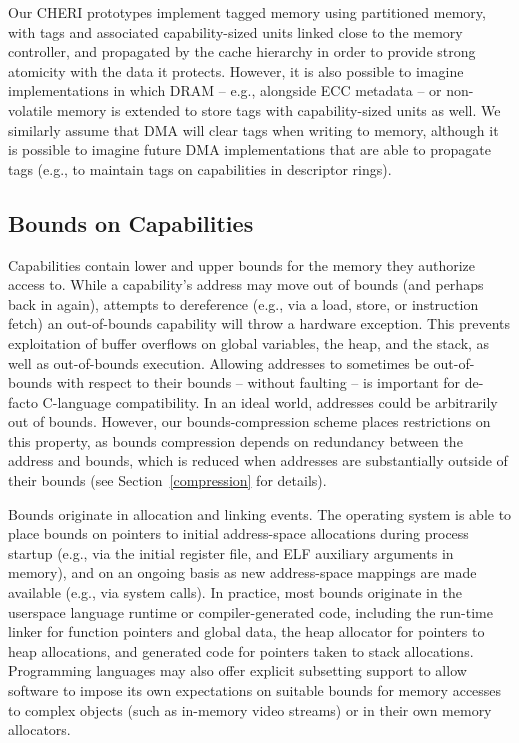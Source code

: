 Our CHERI
prototypes implement tagged memory using partitioned memory, with tags and
associated capability-sized units linked close to the memory controller, and
propagated by the cache hierarchy in order to provide strong atomicity with
the data it protects.
However, it is also possible to imagine implementations in which DRAM --
e.g., alongside ECC metadata -- or
non-volatile memory is extended to store tags with capability-sized units as
well.
We similarly assume that DMA will clear tags when writing to memory, although
it is possible to imagine future DMA implementations that are able to
propagate tags (e.g., to maintain tags on capabilities in descriptor rings).

\subsection{Bounds on Capabilities}
\label{sec:model-bounds}

Capabilities contain lower and upper bounds for the memory they authorize
access to.
While a capability's address may move out of bounds (and perhaps back in
again), attempts to dereference (e.g., via a load, store, or instruction
fetch) an out-of-bounds capability will throw a hardware exception.
This prevents exploitation of buffer overflows on global variables, the heap,
and the stack, as well as out-of-bounds execution.
Allowing addresses to sometimes be out-of-bounds with respect to their
bounds -- without faulting -- is important for de-facto C-language
compatibility.
In an ideal world, addresses could be arbitrarily out of bounds.
However, our
bounds-compression scheme places restrictions on this property, as bounds
compression depends on redundancy between the address and bounds, which is
reduced when addresses are substantially outside of their bounds (see
Section~\ref{compression} for details).

Bounds originate in allocation and linking events.
The operating system is able to place bounds on pointers to initial
address-space
allocations during process startup (e.g., via the initial register file, and
ELF auxiliary arguments in memory), and on an ongoing basis as new address-space
mappings are made available (e.g., via  system calls).
In practice, most bounds originate in the userspace language runtime or
compiler-generated
code, including the run-time linker for function pointers and global data,
the heap allocator for pointers to heap allocations, and generated code for
pointers taken to stack allocations.
 Programming languages may also offer explicit subsetting support to allow
software to impose its own expectations on suitable bounds for memory accesses
to complex objects (such as in-memory video streams) or in their own memory
allocators.

